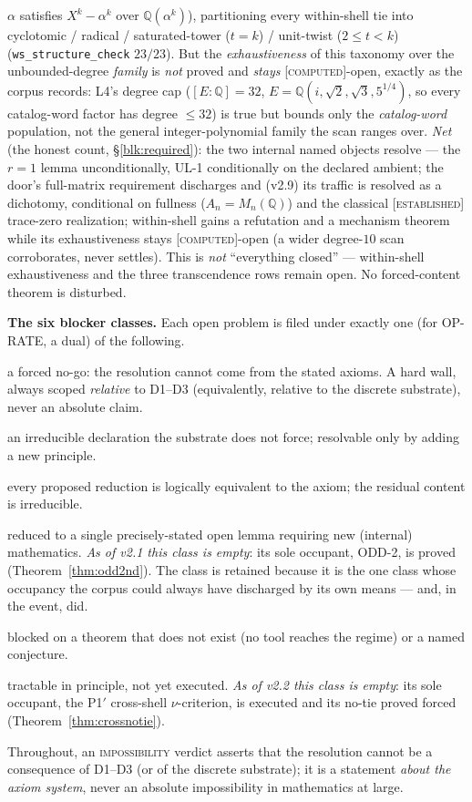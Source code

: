 \documentclass[11pt]{article}
\newcommand{\tagC}{\textcolor{cC}{\textsc{[computed]}}}
\newcommand{\tagE}{\textcolor{cE}{\textsc{[established]}}}
\newcommand{\Q}{\mathbb{Q}}
\theoremstyle{plain}
\theoremstyle{definition}
\theoremstyle{remark}
\begin{document}
$\alpha$ satisfies $X^k-\alpha^k$ over $\Q(\alpha^k)$), partitioning every
within-shell tie into cyclotomic / radical / saturated-tower ($t=k$) / unit-twist
($2\le t<k$) (\texttt{ws\_structure\_check} $23/23$). But the \emph{exhaustiveness} of
this taxonomy over the unbounded-degree \emph{family} is \emph{not} proved and
\emph{stays} \tagC{}-open, exactly as the corpus records: L4's degree cap
($[E:\Q]=32$, $E=\Q(i,\sqrt2,\sqrt3,5^{1/4})$, so every catalog-word factor has degree
$\le32$) is true but bounds only the \emph{catalog-word} population, not the general
integer-polynomial family the scan ranges over. \emph{Net} (the honest count,
\S\ref{blk:required}): the two internal named objects resolve --- the $r=1$ lemma
unconditionally, UL-1 conditionally on the declared ambient; the door's
full-matrix requirement discharges and (v2.9) its traffic is resolved as a
dichotomy, conditional on fullness ($A_n=M_n(\Q)$) and the classical \tagE{}
trace-zero realization; within-shell gains a refutation and a mechanism theorem
while its exhaustiveness stays \tagC{}-open (a wider degree-$10$ scan corroborates,
never settles). This is \emph{not} ``everything closed'' --- within-shell
exhaustiveness and the three transcendence rows remain open. No forced-content
theorem is disturbed.

\smallskip\noindent
\textbf{The six blocker classes.} Each open problem is filed under exactly one
(for OP-RATE, a dual) of the following.
\begin{description}[font=\normalfont\scshape,leftmargin=2.2em,style=nextline,itemsep=1pt,topsep=3pt]
\item[impossibility] a forced no-go: the resolution cannot come from the stated
axioms. A hard wall, always scoped \emph{relative} to D1--D3 (equivalently,
relative to the discrete substrate), never an absolute claim.
\item[declared-atom] an irreducible declaration the substrate does not force;
resolvable only by adding a new principle.
\item[restatement-wall] every proposed reduction is logically equivalent to the
axiom; the residual content is irreducible.
\item[named-lemma] reduced to a single precisely-stated open lemma requiring new
(internal) mathematics. \emph{As of v2.1 this class is empty}: its sole
occupant, ODD-2, is proved (Theorem~\ref{thm:odd2nd}). The class is retained
because it is the one class whose occupancy the corpus could always have
discharged by its own means --- and, in the event, did.
\item[external-tool-gap] blocked on a theorem that does not exist (no tool
reaches the regime) or a named conjecture.
\item[unfinished-computation] tractable in principle, not yet executed.
\emph{As of v2.2 this class is empty}: its sole occupant, the P1$'$ cross-shell
$\nu$-criterion, is executed and its no-tie proved forced
(Theorem~\ref{thm:crossnotie}).
\end{description}
Throughout, an \textsc{impossibility} verdict asserts that the resolution cannot
be a consequence of D1--D3 (or of the discrete substrate); it is a statement
\emph{about the axiom system}, never an absolute impossibility in mathematics at
large.
\end{document}
